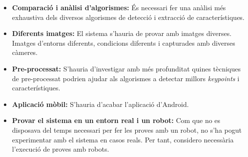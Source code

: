 	\begin{itemize}
		\item{\textbf{Comparació i anàlisi d'algorismes:} És necessari fer una anàlisi més exhaustiva dels diversos algorismes de detecció i extracció de característiques.}
		\item{\textbf{Diferents imatges:} El sistema s'hauria de provar amb imatges diverses. Imatges d'entorns diferents, condicions diferents i capturades amb diverses càmeres.}
		\item{\textbf{Pre-processat:} S'hauria d'investigar amb més profunditat quines tècniques de pre-processat podrien ajudar als algorismes a detectar millors \textit{keypoints} i característiques.}
		\item{\textbf{Aplicació mòbil:} S'hauria d'acabar l'aplicació d'Android.}
		\item{\textbf{Provar el sistema en un entorn real i un robot:} Com que no es disposava del temps necessari per fer les proves amb un robot, no s'ha pogut experimentar amb el sistema en casos reals. Per tant,
		considero necessària l'execució de proves amb robots.}
	\end{itemize}
